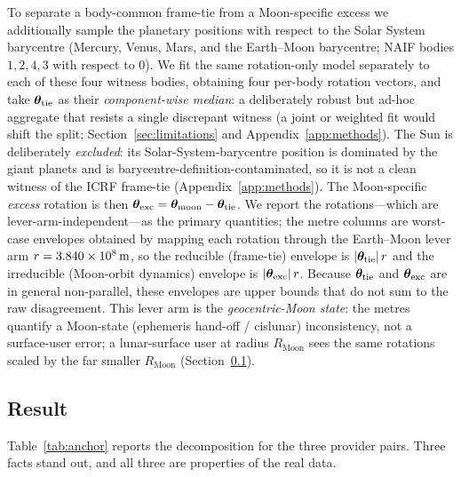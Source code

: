 To separate a body-common frame-tie from a Moon-specific excess we additionally
sample the planetary positions with respect to the Solar System barycentre
(Mercury, Venus, Mars, and the Earth--Moon barycentre; NAIF bodies $1,2,4,3$ with
respect to $0$). We fit the same rotation-only model separately to each of these four
witness bodies, obtaining four per-body rotation vectors, and take
$\bm{\theta}_{\mathrm{tie}}$ as their \emph{component-wise median}: a deliberately robust but
ad-hoc aggregate that resists a single discrepant witness (a joint or weighted fit
would shift the split; Section~\ref{sec:limitations} and
Appendix~\ref{app:methods}). The Sun is deliberately \emph{excluded}: its
Solar-System-barycentre position is dominated by the giant planets and is
barycentre-definition-contaminated, so it is not a clean witness of the ICRF
frame-tie (Appendix~\ref{app:methods}). The Moon-specific \emph{excess} rotation is
then $\bm{\theta}_{\mathrm{exc}}=\bm{\theta}_{\mathrm{moon}}-\bm{\theta}_{\mathrm{tie}}$. We report the
rotations---which are lever-arm-independent---as the primary quantities; the metre
columns are worst-case envelopes obtained by mapping each rotation through the
Earth--Moon lever arm $r=\SI{3.840e8}{m}$, so the reducible (frame-tie) envelope
is $|\bm{\theta}_{\mathrm{tie}}|\,r$ and the irreducible (Moon-orbit dynamics) envelope
is $|\bm{\theta}_{\mathrm{exc}}|\,r$. Because $\bm{\theta}_{\mathrm{tie}}$ and
$\bm{\theta}_{\mathrm{exc}}$ are in general non-parallel, these envelopes are upper bounds
that do not sum to the raw disagreement. This lever arm is the \emph{geocentric-Moon
state}: the metres quantify a Moon-state (ephemeris hand-off / cislunar) inconsistency,
not a surface-user error; a lunar-surface user at radius $R_{\mathrm{Moon}}$ sees the
same rotations scaled by the far smaller $R_{\mathrm{Moon}}$
(Section~\ref{sec:interephresult}).

\subsection{Result}
\label{sec:interephresult}

Table~\ref{tab:anchor} reports the decomposition for the three provider pairs. Three
facts stand out, and all three are properties of the real data.

